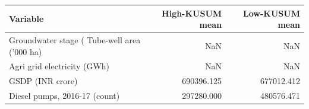 \begin{tabular}{lrr}
\toprule
Variable & High-KUSUM mean & Low-KUSUM mean \\
\midrule
Groundwater stage (%
Tube-well area ('000 ha) & NaN & NaN \\
Agri grid electricity (GWh) & NaN & NaN \\
GSDP (INR crore) & 690396.125 & 677012.412 \\
Diesel pumps, 2016-17 (count) & 297280.000 & 480576.471 \\
\bottomrule
\end{tabular}
